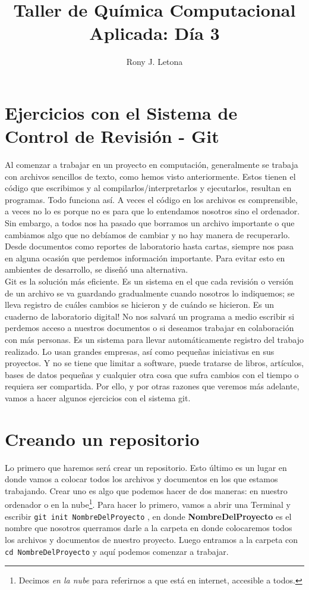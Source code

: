 \documentclass[10pt,letterpaper]{article}
\author{Rony J. Letona}
\title{Taller de Qu\'imica Computacional Aplicada: D\'ia 3}
\newcommand{\inlinecode}[1]{
\colorbox{light-gray}{\texttt{#1}}
}
\begin{document}
\maketitle

\section{Ejercicios con el Sistema de Control de Revisi\'on - Git}
Al comenzar a trabajar en un proyecto en computaci\'on, generalmente se trabaja con archivos sencillos de texto, como hemos visto anteriormente. Estos tienen el c\'odigo que escribimos y al compilarlos/interpretarlos y ejecutarlos, resultan en programas. Todo funciona as\'i. A veces el c\'odigo en los archivos es comprensible, a veces no lo es porque no es para que lo entendamos nosotros sino el ordenador. Sin embargo, a todos nos ha pasado que borramos un archivo importante o que cambiamos algo que no deb\'iamos de cambiar y no hay manera de recuperarlo. Desde documentos como reportes de laboratorio hasta cartas, siempre nos pasa en alguna ocasi\'on que perdemos informaci\'on importante. Para evitar esto en ambientes de desarrollo, se dise\~n\'o una alternativa.\\

Git es la soluci\'on m\'as eficiente. Es un sistema en el que cada revisi\'on o versi\'on de un archivo se va guardando gradualmente cuando nosotros lo indiquemos; se lleva registro de cu\'ales cambios se hicieron y de cu\'ando se hicieron. Es un cuaderno de laboratorio digital! No nos salvar\'a un programa a medio escribir si perdemos acceso a nuestros documentos o si deseamos trabajar en colaboraci\'on con m\'as personas. Es un sistema para llevar autom\'aticamente registro del trabajo realizado. Lo usan grandes empresas, as\'i como peque\~nas iniciativas en sus proyectos. Y no se tiene que limitar a software, puede tratarse de libros, art\'iculos, bases de datos peque\~nas y cualquier otra cosa que sufra cambios con el tiempo o requiera ser compartida. Por ello, y por otras razones que veremos m\'as adelante, vamos a hacer algunos ejercicios con el sistema git.

\section{Creando un repositorio}
Lo primero que haremos ser\'a crear un repositorio. Esto \'ultimo es un lugar en donde vamos a colocar todos los archivos y documentos en los que estamos trabajando. Crear uno es algo que podemos hacer de dos maneras: en nuestro ordenador o en la nube\footnote{Decimos \emph{en la nube} para referirnos a que est\'a en internet, accesible a todos.}. Para hacer lo primero, vamos a abrir una Terminal y escribir \inlinecode{git init NombreDelProyecto}, en donde \textbf{NombreDelProyecto} es el nombre que nosotros querramos darle a la carpeta en donde colocaremos todos los archivos y documentos de nuestro proyecto. Luego entramos a la carpeta con \inlinecode{cd NombreDelProyecto} y aqu\'i podemos comenzar a trabajar.\\
\end{document}
